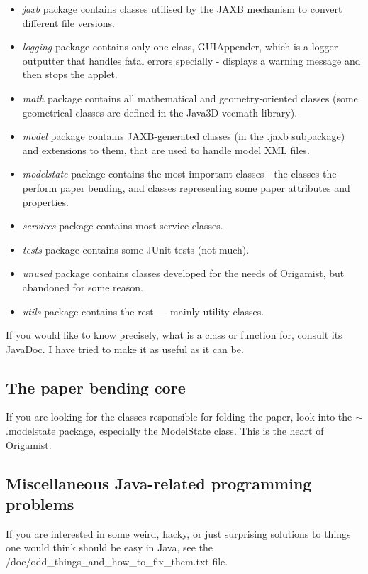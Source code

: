 \begin{itemize}
\begin{itemize}
	\item \emph{jaxb} package contains classes utilised by the JAXB mechanism to convert different file versions.
	\item \emph{logging} package contains only one class, GUIAppender, which is a logger outputter that handles fatal errors specially - displays a warning message and then stops the applet.
	\item \emph{math} package contains all mathematical and geometry-oriented classes (some geometrical classes are defined in the Java3D vecmath library).
	\item \emph{model} package contains JAXB-generated classes (in the .jaxb subpackage) and extensions to them, that are used to handle model XML files.
	\item \emph{modelstate} package contains the most important classes - the classes the perform paper bending, and classes representing some paper attributes and properties.
	\item \emph{services} package contains most service classes.
	\item \emph{tests} package contains some JUnit tests (not much).
	\item \emph{unused} package contains classes developed for the needs of Origamist, but abandoned for some reason.
	\item \emph{utils} package contains the rest --- mainly utility classes.
	\end{itemize}
\end{itemize}

If you would like to know precisely, what is a class or function for, consult its JavaDoc. I have tried to make it as useful as it can be.

\subsection{The paper bending core}
If you are looking for the classes responsible for folding the paper, look into the $\sim$.modelstate package, especially the ModelState class. This is the heart of Origamist.

\subsection{Miscellaneous Java-related programming problems}
If you are interested in some weird, hacky, or just surprising solutions to things one would think should be easy in Java, see the \\ /doc/odd\_things\_and\_how\_to\_fix\_them.txt file.
